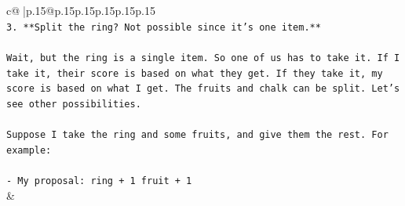 \documentclass{article}
\begin{document}
{\begin{supertabular}{c@{$\;$}|p{.15\linewidth}@{}p{.15\linewidth}p{.15\linewidth}p{.15\linewidth}p{.15\linewidth}p{.15\linewidth}}
{{{\\ 
\texttt{3. **Split the ring? Not possible since it's one item.**} \\
\\ 
\texttt{Wait, but the ring is a single item. So one of us has to take it. If I take it, their score is based on what they get. If they take it, my score is based on what I get. The fruits and chalk can be split. Let's see other possibilities.} \\
\\ 
\texttt{Suppose I take the ring and some fruits, and give them the rest. For example:} \\
\\ 
\texttt{{-} My proposal: ring + 1 fruit + 1} \\
            }
        }
    }
    & \\ \\


\end{supertabular}}
\end{document}
